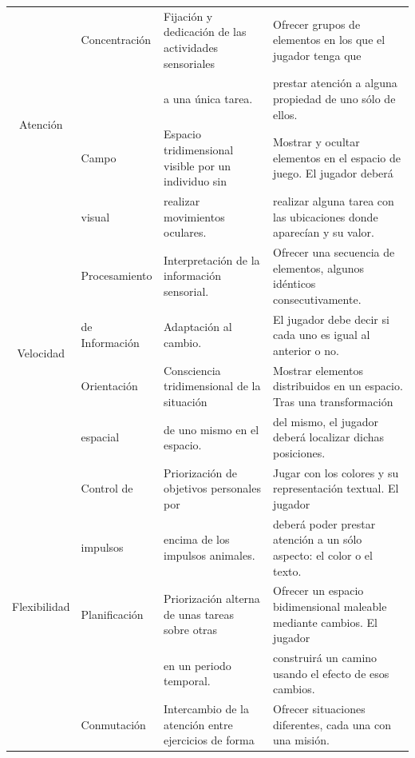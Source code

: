 \begin{table}[H]
\begin{footnotesize}
\begin{center}
\begin{sideways}
\begin{tabular}{|c|l|l|l|}
\multirow{4}{*}{\begin{sideways}Atención\end{sideways}} & Concentración & Fijación y dedicación de las actividades sensoriales & Ofrecer grupos de elementos en los que el jugador tenga que \\
 &  & a una única tarea. & prestar atención a alguna propiedad de uno sólo de ellos. \\
\cline{2-4}
 & Campo & Espacio tridimensional visible por un individuo sin & Mostrar y ocultar elementos en el espacio de juego. El jugador deberá \\
 & visual & realizar movimientos oculares. & realizar alguna tarea con las ubicaciones donde aparecían y su valor. \\
\hline\hline

\multirow{4}{*}{\begin{sideways}Velocidad\end{sideways}} & Procesamiento & Interpretación de la información sensorial. &  Ofrecer una secuencia de elementos, algunos idénticos consecutivamente. \\
 & de Información & Adaptación al cambio. & El jugador debe decir si cada uno es igual al anterior o no. \\
\cline{2-4}
 & Orientación & Consciencia tridimensional de la situación & Mostrar elementos distribuidos en un espacio. Tras una transformación \\
 & espacial & de uno mismo en el espacio. & del mismo, el jugador deberá localizar dichas posiciones. \\
\hline\hline
\multirow{8}{*}{\begin{sideways}Flexibilidad\end{sideways}} & Control de & Priorización de objetivos personales por & Jugar con los colores y su representación textual. El jugador \\
 & impulsos & encima de los impulsos animales. & deberá poder prestar atención a un sólo aspecto: el color o el texto. \\
\cline{2-4}
& Planificación & Priorización alterna de unas tareas sobre otras & Ofrecer un espacio bidimensional maleable mediante cambios. El jugador \\
& & en un periodo temporal. & construirá un camino usando el efecto de esos cambios. \\
\cline{2-4}
& Conmutación & Intercambio de la atención entre ejercicios de forma & Ofrecer situaciones diferentes, cada una con una misión. \\

\end{tabular}
\end{sideways}
\end{center}
\end{footnotesize}
\end{table}
